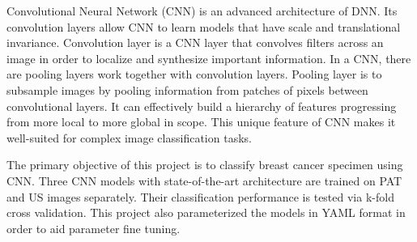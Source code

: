 Convolutional Neural Network (CNN) \citep{Krizhevsky2017} is an advanced architecture of DNN. Its convolution layers allow CNN to learn models that have scale and translational invariance. Convolution layer is a CNN layer that convolves filters across an image in order to localize and synthesize important information. In a CNN, there are pooling layers work together with convolution layers. Pooling layer is to subsample images by pooling information from patches of pixels between convolutional layers. It can effectively build a hierarchy of features progressing from more local to more global in scope. This unique feature of CNN makes it well-suited for complex image classification tasks.

The primary objective of this project is to classify breast cancer specimen using CNN. Three CNN models with state-of-the-art architecture are trained on PAT and US images separately. Their classification performance is tested via k-fold cross validation. This project also parameterized the models in YAML format in order to aid parameter fine tuning.





